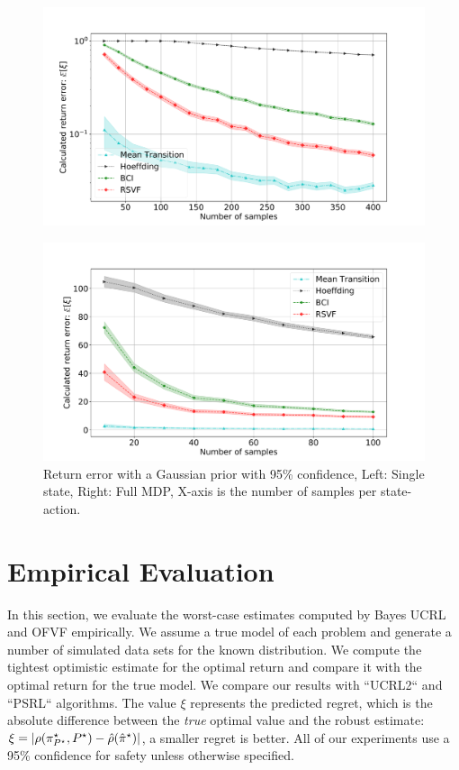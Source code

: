 \documentclass{article}
\DeclarePairedDelimiter{\abs}{\vert}{\rvert}
\newcommand{\opt}{^\star}
\theoremstyle{plain}
\theoremstyle{definition}
\begin{document}
\begin{figure}
	\centering
	\begin{minipage}[c]{.45\columnwidth}
		\centering
		\includegraphics[width=\linewidth]{fig/gaussian_return_single_state.pdf}\\
	\end{minipage}%
	\begin{minipage}[c]{.45\columnwidth}
		\centering
		\includegraphics[width=\linewidth]{fig/Glossy_Buckthorn_Under_Estimation.pdf}
	\end{minipage}%
	\caption{Return error with a Gaussian prior with 95\% confidence, Left: Single state, Right: Full MDP, X-axis is the number of samples per state-action.}
	\label{fig:return_single_multiple}
\end{figure}

\section{Empirical Evaluation} \label{sec:experiments}

In this section, we evaluate the worst-case estimates computed by Bayes UCRL and OFVF empirically. We assume a true model of each problem and generate a number of simulated data sets for the known distribution. We compute the tightest optimistic estimate for the optimal return and compare it with the optimal return for the true model. We compare our results with ``UCRL2`` and ``PSRL`` algorithms. The value $\xi$ represents the predicted regret, which is the absolute difference between the \emph{true} optimal value and the robust estimate: $\xi = \abs{\rho(\pi\opt_{P\opt}, P\opt) - \hat\rho(\hat\pi\opt)}$, a smaller regret is better. All of our experiments use a 95\% confidence for safety unless otherwise specified.
\end{document}
